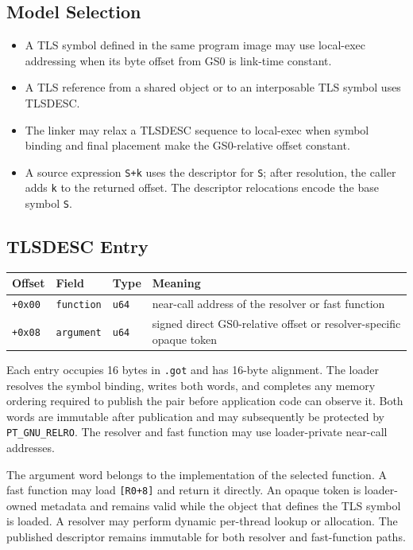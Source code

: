 \documentclass[10pt,twoside]{article}
\begin{document}
\subsection{Model Selection}
\begin{itemize}
\item A TLS symbol defined in the same program image may use local-exec addressing when its byte offset from GS0 is link-time constant.
\item A TLS reference from a shared object or to an interposable TLS symbol uses TLSDESC.
\item The linker may relax a TLSDESC sequence to local-exec when symbol binding and final placement make the GS0-relative offset constant.
\item A source expression \texttt{S+k} uses the descriptor for \texttt{S}; after resolution, the caller adds \texttt{k} to the returned offset. The descriptor relocations encode the base symbol \texttt{S}.
\end{itemize}
\Needspace{1.8in}
\subsection{TLSDESC Entry}
\begingroup\footnotesize
\setlength{\tabcolsep}{2pt}
\begin{longtable}{@{}p{0.8in}p{1.7in}p{0.65in}p{2.35in}@{}}
\toprule
\textbf{Offset} & \textbf{Field} & \textbf{Type} & \textbf{Meaning}\\
\midrule
\endhead
\texttt{+0x00} & \texttt{function} & \texttt{u64} & near-call address of the resolver or fast function\\
\texttt{+0x08} & \texttt{argument} & \texttt{u64} & signed direct GS0-relative offset or resolver-specific opaque token\\
\bottomrule
\end{longtable}
\endgroup

Each entry occupies 16 bytes in \texttt{.got} and has 16-byte alignment. The
loader resolves the symbol binding, writes both words, and completes any memory
ordering required to publish the pair before application code can observe it.
Both words are immutable after publication and may subsequently be protected by
\texttt{PT\_GNU\_RELRO}. The resolver and fast function may use loader-private
near-call addresses.

The argument word belongs to the implementation of the selected function. A
fast function may load \texttt{[R0+8]} and return it directly. An opaque token
is loader-owned metadata and remains valid while the object that defines
the TLS symbol is loaded. A resolver may perform dynamic per-thread lookup or
allocation. The published descriptor remains immutable for both resolver and
fast-function paths.
\end{document}
